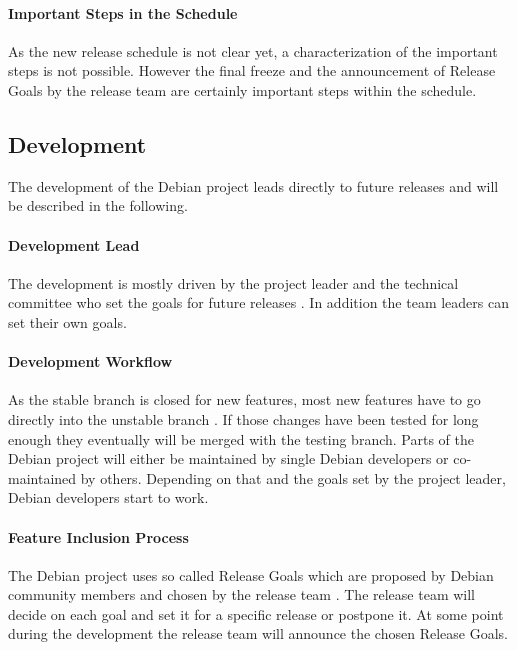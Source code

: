 \paragraph{Important Steps in the Schedule}

As the new release schedule is not clear yet, a characterization of the
important steps is not possible. However the final freeze and the announcement
of Release Goals by the release team are certainly important steps within the
schedule.

\subsection{Development}

The development of the Debian project leads directly to future releases and
will be described in the following.

\paragraph{Development Lead}

The development is mostly driven by the project leader and the technical
committee who set the goals for future releases \cite{DebianOrg}. In addition
the team leaders can set their own goals.

\paragraph{Development Workflow}

As the stable branch is closed for new features, most new features have to go
directly into the unstable branch
\cite{DebianFAQ,DebianDev,DebianReleaseManagement}. If those changes have been
tested for long enough they eventually will be merged with the testing branch.
Parts of the Debian project will either be maintained by single Debian
developers or co-maintained by others. Depending on that and the goals set by
the project leader, Debian developers start to work.

\paragraph{Feature Inclusion Process}

The Debian project uses so called Release Goals which are proposed by Debian
community members and chosen by the release team
\cite{DebianReleaseGoals,McGovern2011}. The release team will decide on each
goal and set it for a specific release or postpone it. At some point during the
development the release team will announce the chosen Release Goals.


